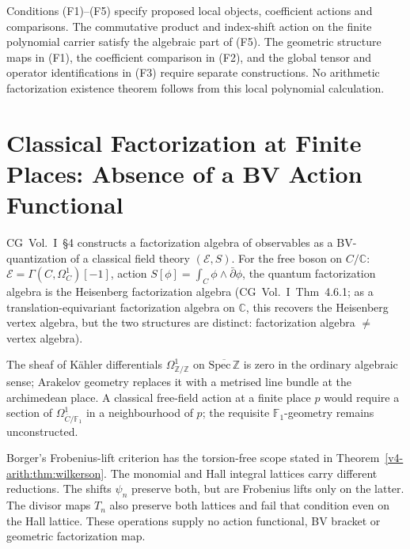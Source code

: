 \begin{remark}
\label{v4-arith:thm:CG-conclusion}
Conditions (F1)--(F5) specify proposed local objects, coefficient actions
and comparisons. The commutative product and index-shift action on the
finite polynomial carrier satisfy the algebraic part of (F5).
The geometric structure maps in (F1), the coefficient comparison in (F2),
and the global tensor and operator identifications in (F3) require
separate constructions. No arithmetic factorization existence theorem
follows from this local polynomial calculation.
\end{remark}

\section{Classical Factorization at Finite Places: Absence of a BV Action Functional}
\label{v4-arith:cg:BV-quantization-fails}

\begin{remark}
CG~Vol.~I~\S4 constructs a factorization algebra of observables as
a BV-quantization of a classical field theory \((\mathcal{E},S)\).
For the free boson on \(C/\mathbb{C}\):
\(\mathcal{E}=\Gamma(C,\Omega^{1}_{C})[-1]\), action
\(S[\phi]=\int_{C}\phi\wedge\bar{\partial}\phi\), the
quantum factorization algebra is the Heisenberg factorization algebra
(CG~Vol.~I~Thm~4.6.1; as a translation-equivariant factorization
algebra on \(\mathbb{C}\), this recovers the Heisenberg vertex algebra,
but the two structures are distinct: factorization algebra
\(\neq\) vertex algebra).
\end{remark}

\begin{observation}
\label{v4-arith:obs:no-classical-arith-FT}
The sheaf of Kähler differentials \(\Omega^{1}_{\mathbb{Z}/\mathbb{Z}}\)
on \(\overline{\mathrm{Spec}\,\mathbb{Z}}\) is zero in the ordinary
algebraic sense; Arakelov geometry replaces it with a metrised line
bundle at the archimedean place. A classical free-field action at a
finite place \(p\) would require a section of
\(\Omega^{1}_{\overline{C}/\mathbb{F}_{1}}\) in a neighbourhood of
\(p\); the requisite \(\mathbb{F}_{1}\)-geometry remains
unconstructed.
\end{observation}

\begin{remark}
Borger's Frobenius-lift criterion has the torsion-free scope stated in
Theorem~\ref{v4-arith:thm:wilkerson}. The monomial and Hall integral lattices
carry different reductions. The shifts \(\psi_n\) preserve both, but
are Frobenius lifts only on the latter. The divisor maps \(T_n\) also
preserve both lattices and fail that condition even on the Hall lattice.
These operations supply no action functional, BV bracket or geometric
factorization map.
\end{remark}

